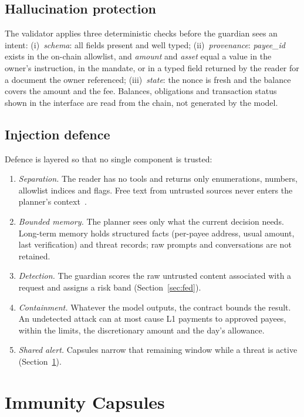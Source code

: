 \documentclass[10pt,a4paper,twocolumn]{article}
\begin{document}
\subsection{Hallucination protection}
The validator applies three deterministic checks before the guardian sees an intent:
(i)~\emph{schema}: all fields present and well typed;
(ii)~\emph{provenance}: \textit{payee\_id} exists in the on-chain allowlist, and
\textit{amount} and \textit{asset} equal a value in the owner's instruction, in the
mandate, or in a typed field returned by the reader for a document the owner referenced;
(iii)~\emph{state}: the nonce is fresh and the balance covers the amount and the fee.
Balances, obligations and transaction status shown in the interface are read from the
chain, not generated by the model.

\subsection{Injection defence}
Defence is layered so that no single component is trusted:
\begin{enumerate}
\item \emph{Separation.} The reader has no tools and returns only enumerations, numbers,
allowlist indices and flags. Free text from untrusted sources never enters the planner's
context~\cite{willison,camel}.
\item \emph{Bounded memory.} The planner sees only what the current decision needs.
Long-term memory holds structured facts (per-payee address, usual amount, last
verification) and threat records; raw prompts and conversations are not retained.
\item \emph{Detection.} The guardian scores the raw untrusted content associated with a
request and assigns a risk band (Section~\ref{sec:fed}).
\item \emph{Containment.} Whatever the model outputs, the contract bounds the result. An
undetected attack can at most cause L1 payments to approved payees, within the limits,
the discretionary amount and the day's allowance.
\item \emph{Shared alert.} Capsules narrow that remaining window while a threat is active
(Section~\ref{sec:capsule}).
\end{enumerate}

\section{Immunity Capsules}
\label{sec:capsule}
\end{document}
